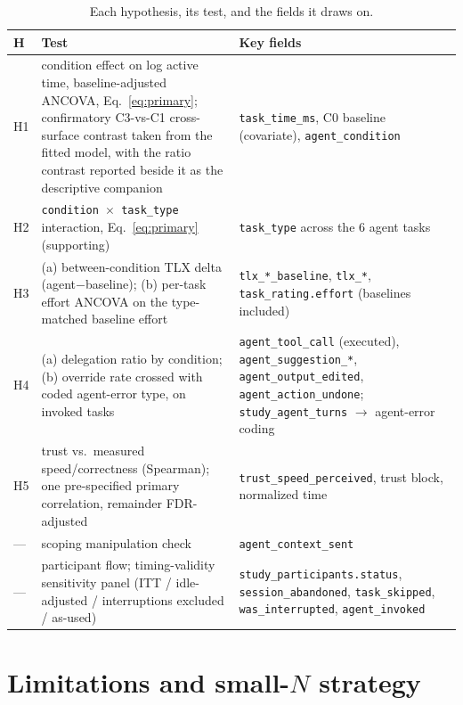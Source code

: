 \documentclass[11pt]{article}
\newcommand{\code}[1]{\texttt{#1}}
\begin{document}
\begin{table}[h]
\centering\small
\begin{tabularx}{\linewidth}{@{}l L L@{}}
\toprule
\textbf{H} & \textbf{Test} & \textbf{Key fields} \\
\midrule
H1 & condition effect on log active time, baseline-adjusted ANCOVA, Eq.~\eqref{eq:primary}; confirmatory C3-vs-C1 cross-surface contrast taken from the fitted model, with the ratio contrast reported beside it as the descriptive companion & \code{task\_time\_ms}, C0 baseline (covariate), \code{agent\_condition} \\
H2 & \code{condition $\times$ task\_type} interaction, Eq.~\eqref{eq:primary} (supporting) & \code{task\_type} across the 6 agent tasks \\
H3 & (a) between-condition TLX delta (agent$-$baseline); (b) per-task effort ANCOVA on the type-matched baseline effort & \code{tlx\_*\_baseline}, \code{tlx\_*}, \code{task\_rating.effort} (baselines included) \\
H4 & (a) delegation ratio by condition; (b) override rate crossed with coded agent-error type, on invoked tasks & \code{agent\_tool\_call} (executed), \code{agent\_suggestion\_*}, \code{agent\_output\_edited}, \code{agent\_action\_undone}; \code{study\_agent\_turns} $\rightarrow$ agent-error coding \\
H5 & trust vs.\ measured speed/correctness (Spearman); one pre-specified primary correlation, remainder FDR-adjusted & \code{trust\_speed\_perceived}, trust block, normalized time \\
--- & scoping manipulation check & \code{agent\_context\_sent} \\
--- & participant flow; timing-validity sensitivity panel (ITT / idle-adjusted / interruptions excluded / as-used) & \code{study\_participants.status}, \code{session\_abandoned}, \code{task\_skipped}, \code{was\_interrupted}, \code{agent\_invoked} \\
\bottomrule
\end{tabularx}
\caption{Each hypothesis, its test, and the fields it draws on.}
\label{tab:hmap}
\end{table}

\section{Limitations and small-$N$ strategy}\label{sec:limits}
\end{document}
